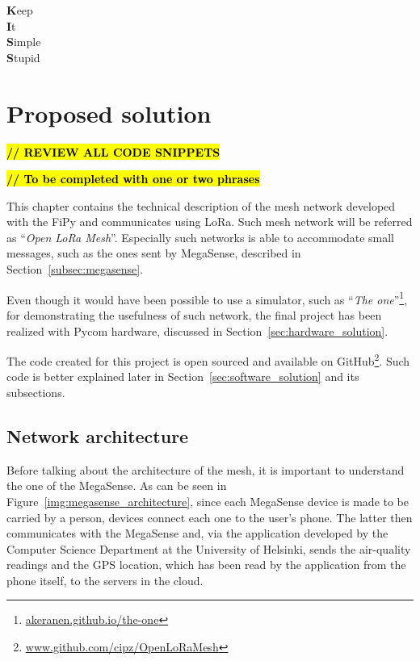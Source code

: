 
\begin{savequote}[40mm]
	\textbf{K}eep\\
	\textbf{I}t\\
	\textbf{S}imple\\
	\textbf{S}tupid
\end{savequote}

\chapter{Proposed solution}\label{chapter:proposed_solution}

	\textbf{\textcolor{red}{\hl{// REVIEW ALL CODE SNIPPETS}}}
	
	\textbf{\textcolor{red}{\hl{// To be completed with one or two phrases}}}

	This chapter contains the technical description of the mesh network developed with the FiPy and communicates using LoRa.
	Such mesh network will be referred as ``\textit{Open LoRa Mesh}''.
	Especially such networks is able to accommodate small messages, such as the ones sent by MegaSense, described in Section~\ref{subsec:megasense}.

	Even though it would have been possible to use a simulator, such as ``\textit{The one}''\footnote{ \url{akeranen.github.io/the-one}}, for demonstrating the usefulness of such network, the final project has been realized with Pycom hardware, discussed in Section~\ref{sec:hardware_solution}.
	
	The code created for this project is open sourced and available on GitHub\footnote{ \url{www.github.com/cipz/OpenLoRaMesh}}.
	Such code is better explained later in Section~\ref{sec:software_solution} and its subsections.
	
	\section{Network architecture}\label{sec:architecture}
		
		Before talking about the architecture of the mesh, it is important to understand the one of the MegaSense.
		As can be seen in Figure~\ref{img:megasense_architecture}, since each MegaSense device is made to be carried by a person, devices connect each one to the user's phone.
		The latter then communicates with the MegaSense and, via the application developed by the Computer Science Department at the University of Helsinki, sends the air-quality readings and the GPS location, which has been read by the application from the phone itself, to the servers in the cloud.
		
